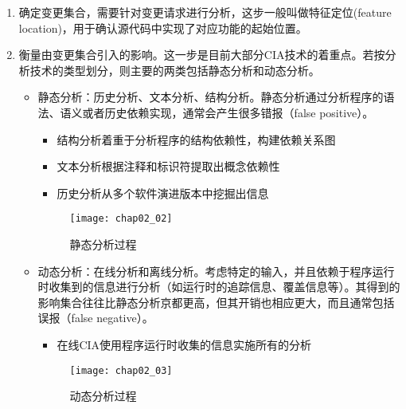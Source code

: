 \begin{enumerate}
	\item 确定变更集合，需要针对变更请求进行分析，这步一般叫做特征定位(feature location)，用于确认源代码中实现了对应功能的起始位置。
	\item 衡量由变更集合引入的影响。这一步是目前大部分CIA技术的着重点。若按分析技术的类型划分，则主要的两类包括静态分析和动态分析。
	\begin{itemize}
	
	\item 静态分析：历史分析、文本分析、结构分析。静态分析通过分析程序的语法、语义或者历史依赖实现，通常会产生很多错报（false positive）。
		\begin{itemize}
		\item 结构分析着重于分析程序的结构依赖性，构建依赖关系图
		\item 文本分析根据注释和标识符提取出概念依赖性
		\item 历史分析从多个软件演进版本中挖掘出信息
		\end{itemize}
		\begin{figure}[H]
			\centering
			\texttt{[image: chap02\_02]}
			\caption {静态分析过程}
		\end{figure}
	
	\item 动态分析：在线分析和离线分析。考虑特定的输入，并且依赖于程序运行时收集到的信息进行分析（如运行时的追踪信息、覆盖信息等）。其得到的影响集合往往比静态分析京都更高，但其开销也相应更大，而且通常包括误报（false negative）。
		\begin{itemize}
		\item 在线CIA使用程序运行时收集的信息实施所有的分析
		\end{itemize}
		
		\begin{figure}[H]
			\centering
			\texttt{[image: chap02\_03]}
			\caption {动态分析过程}
		\end{figure}	

		
	\end{itemize}
\end{enumerate}


